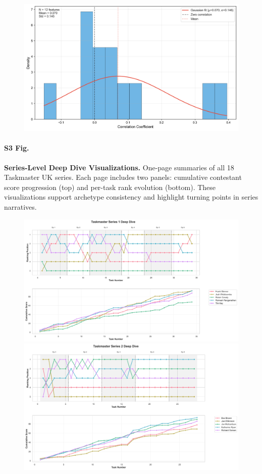 \documentclass[10pt,letterpaper]{article}
\begin{document}
\begin{figure}[!h]
\centering
\includegraphics[width=\linewidth]{figures/supplementary/figure8b_raw_correlations.png}
\end{figure}
\FloatBarrier

\paragraph*{S3 Fig.}
\label{S3_Fig}
{\bf Series-Level Deep Dive Visualizations.}
One-page summaries of all 18 Taskmaster UK series. Each page includes two panels: cumulative contestant score progression (top) and per-task rank evolution (bottom). These visualizations support archetype consistency and highlight turning points in series narratives.

\begin{figure}[!h]
\centering
\includegraphics[width=\linewidth]{figures/supplementary/series_1_deep_dive.png}
\includegraphics[width=\linewidth]{figures/supplementary/series_2_deep_dive.png}
\end{figure}
\FloatBarrier
\clearpage
\end{document}
